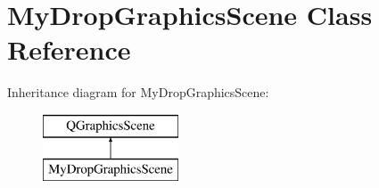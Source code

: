 \hypertarget{class_my_drop_graphics_scene}{}\section{My\+Drop\+Graphics\+Scene Class Reference}
\label{class_my_drop_graphics_scene}
Inheritance diagram for My\+Drop\+Graphics\+Scene\+:\begin{figure}[H]
\begin{center}
\leavevmode
\includegraphics[height=2.000000cm]{class_my_drop_graphics_scene}
\end{center}
\end{figure}
